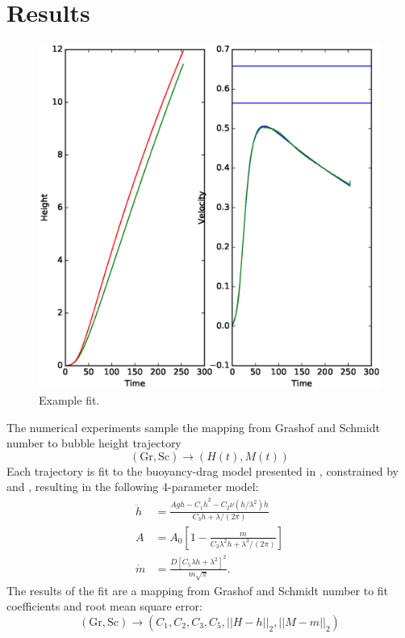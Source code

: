 \section{Results}

\newcommand{\fittol}[0]{0.01~}

\begin{figure}
\includegraphics[width=\columnwidth]{figs/H-0.0016-0.0002.eps}
\caption{ 
  Example fit.
}
\end{figure}

The numerical experiments sample the mapping from Grashof and Schmidt number to bubble height trajectory
\begin{equation*}
\left(\text{Gr}, \text{Sc}\right) \rightarrow \left(H(t), M(t)\right)
\end{equation*}
Each trajectory is fit to the buoyancy-drag model presented in , constrained by  and , resulting in the following 4-parameter model:
\begin{align}
\ddot{h} &= \frac{A g h - C_1 \dot{h}^2 - C_2 \nu (h/\lambda^2) \dot{h}}{ C_3 h + \lambda/(2\pi) } \\
A &= A_0 \left[ 1 - \frac{m}{C_3 \lambda^2 h  + \lambda^3 / (2\pi)} \right]  \\
\dot{m} &= \frac{D \left[C_5 \lambda h + \lambda^2\right] ^2}{m \sqrt{\pi}} .
\end{align}
The results of the fit are a mapping from Grashof and Schmidt number to fit coefficients and root mean square error:
\begin{equation}
\left(\text{Gr}, \text{Sc}\right) \rightarrow \left(C_1, C_2, C_3, C_5, || H - h ||_2, || M - m ||_2\right) 
\end{equation}

